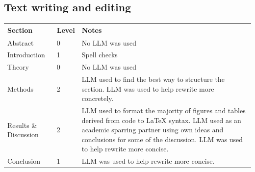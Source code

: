 \documentclass[reprint,english,notitlepage, floatfix]{revtex4-2}  %
\begin{document}
\subsection{Text writing and editing}
\noindent
\begin{tabularx}{\linewidth}{l l X}
Section & Level & Notes\\ \hline
Abstract & 0 & No LLM was used \\
Introduction & 1 & Spell checks \\
Theory & 0 & No LLM was used \\
Methods & 2 & LLM used to find the best way to structure the section. LLM was used to help rewrite more concretely. \\
Results \& Discussion & 2 & LLM used to format the majority of figures and tables derived from code to \LaTeX{} syntax. LLM used as an academic sparring partner using own ideas and conclusions for some of the discussion. LLM was used to help rewrite more concise. \\
Conclusion & 1 & LLM was used to help rewrite more concise. \\
\end{tabularx}
\end{document}
